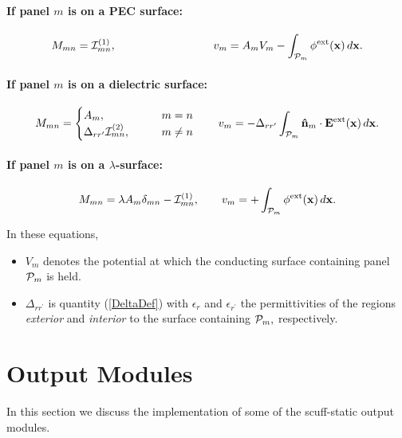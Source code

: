 \documentclass[letterpaper]{article}
\begin{document}
\paragraph{If panel $m$ is on a PEC surface:}
$$
  M_{mn} = \mathcal{I}^{\hbox{\scriptsize{(1)}}}_{mn}, 
   \hspace{1.2in}
   v_m = A_{m} V_m - \int_{\mathcal{P}_m} \phi^{\hbox{\scriptsize{ext}}}(\mathbf{x}) \, d\mathbf{x}.
$$
\paragraph{If panel $m$ is on a dielectric surface:}
$$ M_{mn} = 
   \begin{cases} 
     A_m, \qquad &m=n \\
     \Delta_{rr^\prime} \mathcal{I}^{\hbox{\scriptsize{(2)}}}_{mn}, \qquad &m\ne n
   \end{cases} 
   \qquad 
   v_m = -\Delta_{rr^\prime} \int_{\mathcal{P}_m} \mathbf{\hat n}_m \cdot \mathbf{E}^{\hbox{\scriptsize{ext}}}(\mathbf{x}) \, d\mathbf{x}.
$$
\paragraph{If panel $m$ is on a $\lambda$-surface:}
$$ M_{mn} = 
     \lambda A_{m}\delta_{mn} - \mathcal{I}^{\hbox{\scriptsize{(1)}}}_{mn},
   \qquad 
   v_m = + \int_{\mathcal{P}_m} \phi^{\hbox{\scriptsize{ext}}}(\mathbf{x}) \, d\mathbf{x}.
$$

In these equations, 
\begin{itemize}
 \item $V_m$ denotes the potential at which the conducting surface
       containing panel $\mathcal{P}_m$ is held.
 \item $\Delta_{rr^\prime}$ is quantity (\ref{DeltaDef}) with $\epsilon_r$
       and $\epsilon_{r^\prime}$ the permittivities of the regions 
       \textit{exterior} and \textit{interior} to the surface containing
       $\mathcal{P}_m,$ respectively.
\end{itemize}

\newpage
\section{Output Modules}

In this section we discuss the implementation of some of the 
{\sc scuff-static} output modules.
\end{document}
